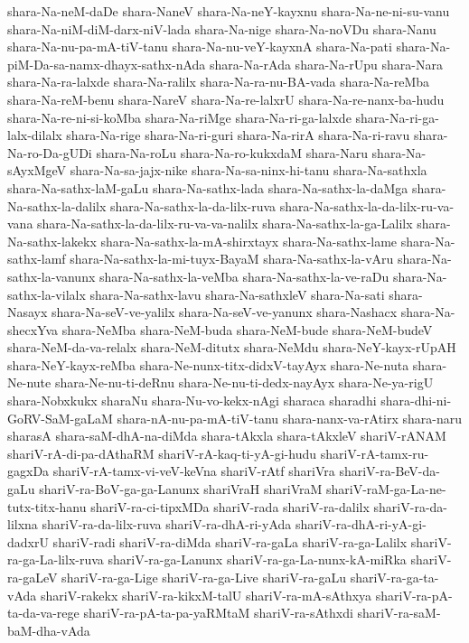 {shara-Na-neM-daDe
shara-NaneV
shara-Na-neY-kayxnu
shara-Na-ne-ni-su-vanu
shara-Na-niM-diM-darx-niV-lada
shara-Na-nige
shara-Na-noVDu
shara-Nanu
shara-Na-nu-pa-mA-tiV-tanu
shara-Na-nu-veY-kayxnA
shara-Na-pati
shara-Na-piM-Da-sa-namx-dhayx-sathx-nAda
shara-Na-rAda
shara-Na-rUpu
shara-Nara
shara-Na-ra-lalxde
shara-Na-ralilx
shara-Na-ra-nu-BA-vada
shara-Na-reMba
shara-Na-reM-benu
shara-NareV
shara-Na-re-lalxrU
shara-Na-re-nanx-ba-hudu
shara-Na-re-ni-si-koMba
shara-Na-riMge
shara-Na-ri-ga-lalxde
shara-Na-ri-ga-lalx-dilalx
shara-Na-rige
shara-Na-ri-guri
shara-Na-rirA
shara-Na-ri-ravu
shara-Na-ro-Da-gUDi
shara-Na-roLu
shara-Na-ro-kukxdaM
shara-Naru
shara-Na-sAyxMgeV
shara-Na-sa-jajx-nike
shara-Na-sa-ninx-hi-tanu
shara-Na-sathxla
shara-Na-sathx-laM-gaLu
shara-Na-sathx-lada
shara-Na-sathx-la-daMga
shara-Na-sathx-la-dalilx
shara-Na-sathx-la-da-lilx-ruva
shara-Na-sathx-la-da-lilx-ru-va-vana
shara-Na-sathx-la-da-lilx-ru-va-va-nalilx
shara-Na-sathx-la-ga-Lalilx
shara-Na-sathx-lakekx
shara-Na-sathx-la-mA-shirxtayx
shara-Na-sathx-lame
shara-Na-sathx-lamf
shara-Na-sathx-la-mi-tuyx-BayaM
shara-Na-sathx-la-vAru
shara-Na-sathx-la-vanunx
shara-Na-sathx-la-veMba
shara-Na-sathx-la-ve-raDu
shara-Na-sathx-la-vilalx
shara-Na-sathx-lavu
shara-Na-sathxleV
shara-Na-sati
shara-Nasayx
shara-Na-seV-ve-yalilx
shara-Na-seV-ve-yanunx
shara-Nashacx
shara-Na-shecxYva
shara-NeMba
shara-NeM-buda
shara-NeM-bude
shara-NeM-budeV
shara-NeM-da-va-relalx
shara-NeM-ditutx
shara-NeMdu
shara-NeY-kayx-rUpAH
shara-NeY-kayx-reMba
shara-Ne-nunx-titx-didxV-tayAyx
shara-Ne-nuta
shara-Ne-nute
shara-Ne-nu-ti-deRnu
shara-Ne-nu-ti-dedx-nayAyx
shara-Ne-ya-rigU
shara-Nobxkukx
sharaNu
shara-Nu-vo-kekx-nAgi
sharaca
sharadhi
shara-dhi-ni-GoRV-SaM-gaLaM
shara-nA-nu-pa-mA-tiV-tanu
shara-nanx-va-rAtirx
shara-naru
sharasA
shara-saM-dhA-na-diMda
shara-tAkxla
shara-tAkxleV
shariV-rANAM
shariV-rA-di-pa-dAthaRM
shariV-rA-kaq-ti-yA-gi-hudu
shariV-rA-tamx-ru-gagxDa
shariV-rA-tamx-vi-veV-keVna
shariV-rAtf
shariVra
shariV-ra-BeV-da-gaLu
shariV-ra-BoV-ga-ga-Lanunx
shariVraH
shariVraM
shariV-raM-ga-La-ne-tutx-titx-hanu
shariV-ra-ci-tipxMDa
shariV-rada
shariV-ra-dalilx
shariV-ra-da-lilxna
shariV-ra-da-lilx-ruva
shariV-ra-dhA-ri-yAda
shariV-ra-dhA-ri-yA-gi-dadxrU
shariV-radi
shariV-ra-diMda
shariV-ra-gaLa
shariV-ra-ga-Lalilx
shariV-ra-ga-La-lilx-ruva
shariV-ra-ga-Lanunx
shariV-ra-ga-La-nunx-kA-miRka
shariV-ra-gaLeV
shariV-ra-ga-Lige
shariV-ra-ga-Live
shariV-ra-gaLu
shariV-ra-ga-ta-vAda
shariV-rakekx
shariV-ra-kikxM-talU
shariV-ra-mA-sAthxya
shariV-ra-pA-ta-da-va-rege
shariV-ra-pA-ta-pa-yaRMtaM
shariV-ra-sAthxdi
shariV-ra-saM-baM-dha-vAda
}
